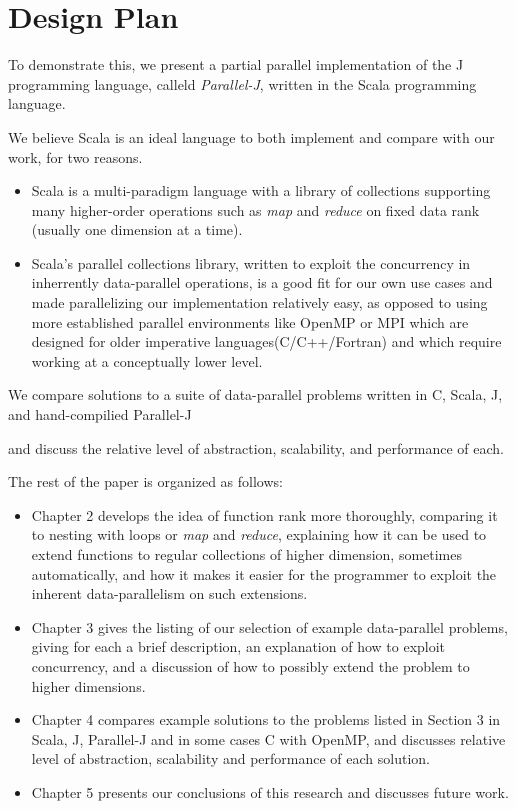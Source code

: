 \section{Design Plan}
To demonstrate this, we present a partial parallel implementation of the J programming language, calleld \textit{Parallel-J}, written in the Scala programming language.\begin{comment}TODO cite?\end{comment}
We believe Scala is an ideal language to both implement and compare with our work, for two reasons.
\begin{itemize}
    \item Scala is a multi-paradigm language with a library of collections supporting many higher-order operations such as \textit{map} and \textit{reduce} on fixed data rank (usually one dimension at a time). %
    \item Scala's parallel collections library\cite{pc}, written to exploit the concurrency in inherrently data-parallel operations, is a good fit for our own use cases and made parallelizing our implementation relatively easy, as opposed to using more established parallel environments like OpenMP or MPI which are designed for older imperative languages(C/C++/Fortran) and which require working at a conceptually lower level.
\end{itemize}
We compare solutions to a suite of data-parallel problems written in C, Scala, J, and hand-compilied Parallel-J\begin{comment}TODO really should change name\end{comment} and discuss the relative level of abstraction, scalability, and performance of each.

The rest of the paper is organized as follows:
\begin{itemize}
    \item Chapter 2 develops the idea of function rank more thoroughly, comparing it to nesting with loops or \textit{map} and \textit{reduce}, explaining how it can be used to extend functions to regular collections of higher dimension, sometimes automatically, and how it makes it easier for the programmer to exploit the inherent data-parallelism on such extensions. 
    \item Chapter 3 gives the listing of our selection of example data-parallel problems, giving for each a brief description, an explanation of how to exploit concurrency, and a discussion of how to possibly extend the problem to higher dimensions.
    \item Chapter 4 compares example solutions to the problems listed in Section 3 in Scala, J, Parallel-J and in some cases C with OpenMP, and discusses relative level of abstraction, scalability and performance of each solution. 
    \item Chapter 5 presents our conclusions of this research and discusses future work.
\end{itemize}

